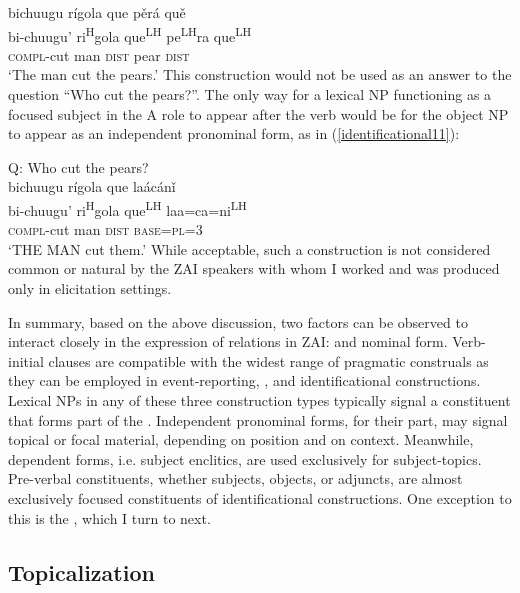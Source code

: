 \ea\label{identificational10} 
\glll bichuugu r\'{i}gola que p\v{e}r\'{a} qu\v{e}  \\
bi-chuugu' ri\textsuperscript{H}gola que\textsuperscript{LH} pe\textsuperscript{LH}ra que\textsuperscript{LH}  \\
\textsc{compl}-cut man \textsc{dist} pear \textsc{dist}  \\
\glt `The man cut the pears.'
\z
This construction would not be used as an answer to the question ``Who cut the pears?''. The only way for a lexical NP functioning as a focused subject in the A role to appear after the verb would be for the object NP to appear as an independent pronominal form, as in (\ref{identificational11}):

\ea\label{identificational11}  
{Q: Who cut the pears?} \\
\glll bichuugu r\'{i}gola que la\'{a}c\'{a}n\v{i}  \\
bi-chuugu' ri\textsuperscript{H}gola que\textsuperscript{LH} laa=ca=ni\textsuperscript{LH}  \\
\textsc{compl}-cut man \textsc{dist} \textsc{base}=\textsc{pl}=\textsc{3}  \\
\glt `THE MAN cut them.'
\z
While acceptable, such a construction is not considered common or natural by the ZAI speakers with whom I worked and was produced only in elicitation settings.

In summary, based on the above discussion, two factors can be observed to interact closely in the expression of  relations in ZAI:  and nominal form. Verb-initial clauses are compatible with the widest range of pragmatic construals as they can be employed in event-reporting, , and identificational constructions. Lexical NPs in any of these three construction types typically signal a constituent that forms part of the . Independent pronominal forms, for their part, may signal topical or focal material, depending on position and on context. Meanwhile, dependent forms, i.e. subject enclitics, are used exclusively for subject-topics. Pre-verbal constituents, whether subjects, objects, or adjuncts, are almost exclusively focused constituents of identificational constructions. One exception to this is the , which I turn to next.


\subsection{Topicalization}\label{topicalizationsection}

